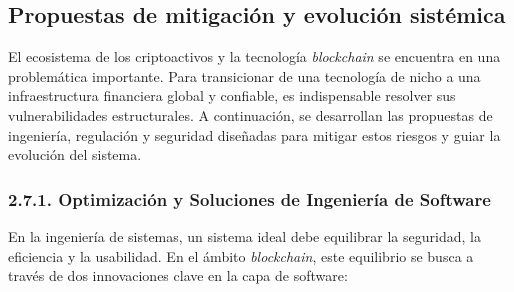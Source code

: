 \documentclass[12pt,a4paper]{article}
\begin{document}
\subsection{Propuestas de mitigación y evolución sistémica}

El ecosistema de los criptoactivos y la tecnología \textit{blockchain} se encuentra en una problemática importante. Para transicionar de una tecnología de nicho a una infraestructura financiera global y confiable, es indispensable resolver sus vulnerabilidades estructurales. A continuación, se desarrollan las propuestas de ingeniería, regulación y seguridad diseñadas para mitigar estos riesgos y guiar la evolución del sistema.

\subsubsection*{2.7.1. Optimización y Soluciones de Ingeniería de Software}

En la ingeniería de sistemas, un sistema ideal debe equilibrar la seguridad, la eficiencia y la usabilidad. En el ámbito \textit{blockchain}, este equilibrio se busca a través de dos innovaciones clave en la capa de software:
\end{document}
